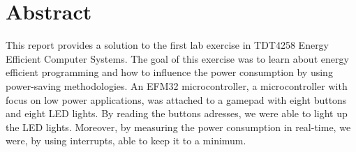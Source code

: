 \section{Abstract}

This report provides a solution to the first lab exercise in TDT4258 Energy Efficient Computer Systems.
The goal of this exercise was to learn about energy efficient programming and how to influence the power consumption by using power-saving methodologies.
An EFM32 microcontroller, a microcontroller with focus on low power applications, was attached to a gamepad with eight buttons and eight LED lights.
By reading the buttons adresses, we were able to light up the LED lights.
Moreover, by measuring the power consumption in real-time, we were, by using interrupts, able to keep it to a minimum.
